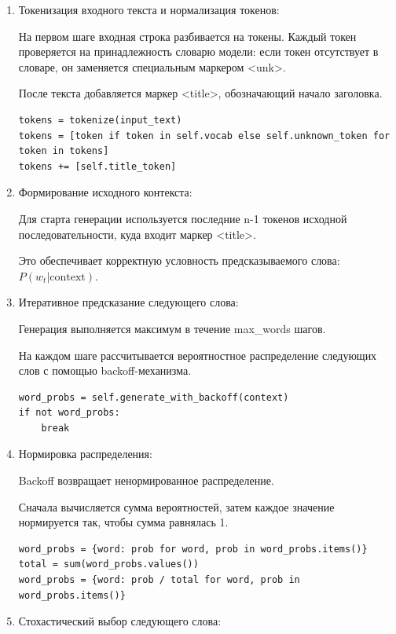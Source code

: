 \documentclass[coursework]{SCWorks}
\begin{document}
    \begin{enumerate}
        \item Токенизация входного текста и нормализация токенов:

        На первом шаге входная строка разбивается на токены.
        Каждый токен проверяется на принадлежность словарю модели:
        если токен отсутствует в словаре, он заменяется специальным маркером <unk>.

        После текста добавляется маркер <title>, обозначающий начало заголовка.

        \begin{verbatim}
tokens = tokenize(input_text)
tokens = [token if token in self.vocab else self.unknown_token for token in tokens]
tokens += [self.title_token]
        \end{verbatim}


        \item Формирование исходного контекста:

        Для старта генерации используется последние n-1 токенов исходной последовательности, куда входит маркер <title>.

        Это обеспечивает корректную условность предсказываемого слова: \\ $P(w_t | \text{context})$.
        \item Итеративное предсказание следующего слова:

        Генерация выполняется максимум в течение max\_words шагов.

        На каждом шаге рассчитывается вероятностное распределение следующих слов с помощью backoff-механизма.

        \begin{verbatim}
word_probs = self.generate_with_backoff(context)
if not word_probs:
    break
        \end{verbatim}

        \item Нормировка распределения:

        Backoff возвращает ненормированное распределение.

        Сначала вычисляется сумма вероятностей, затем каждое значение нормируется так, чтобы сумма равнялась 1.

        \begin{verbatim}
word_probs = {word: prob for word, prob in word_probs.items()}
total = sum(word_probs.values())
word_probs = {word: prob / total for word, prob in word_probs.items()}
        \end{verbatim}
        \item Стохастический выбор следующего слова:


\end{enumerate}
\end{document}
